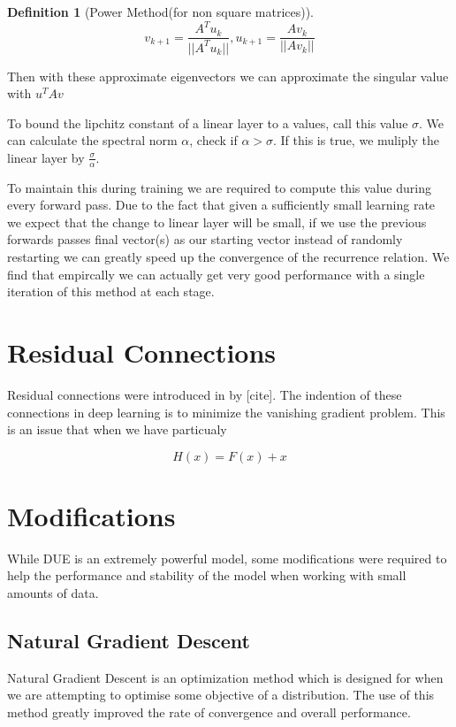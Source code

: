 \documentclass[12pt, a4paper]{report}
\theoremstyle{definition}
\theoremstyle{definition}
\newtheorem{definition}{Definition}[section]
\theoremstyle{definition}
\begin{document}
\begin{definition}[Power Method(for non square matrices)]
    $$v_{k+1} = \frac{A^Tu_k}{||A^Tu_k||}, u_{k+1} = \frac{Av_k}{||Av_k||} $$
\end{definition}

Then with these approximate eigenvectors we can approximate the singular value with $u^T A v$

To bound the lipchitz constant of a linear layer to a values, call this value $\sigma$. We can calculate the spectral norm $\alpha$, check if $\alpha > \sigma$. If this is true, we muliply the linear layer by $\frac{\sigma}{\alpha}$.

To maintain this during training we are required to compute this value during every forward pass. Due to the fact that given a sufficiently small learning rate we expect that the change to linear layer will be small, if we use the previous forwards passes final vector(s) as our starting vector instead of randomly restarting we can greatly speed up the convergence of the recurrence relation. We find that empircally we can actually get very good performance with a single iteration of this method at each stage.


\section{Residual Connections}

Residual connections were introduced in by [cite]. The indention of these connections in deep learning is to minimize the vanishing gradient problem. This is an issue that when we have particualy

$$H(x) = F(x) + x$$


\section{Modifications}

While DUE is an extremely powerful model, some modifications were required to help the performance and stability of the model when working with small amounts of data. 

\subsection{Natural Gradient Descent}

Natural Gradient Descent is an optimization method which is designed for when we are attempting to optimise some objective of a distribution. The use of this method greatly improved the rate of convergence and overall performance. \cite{NGD}
\end{document}
